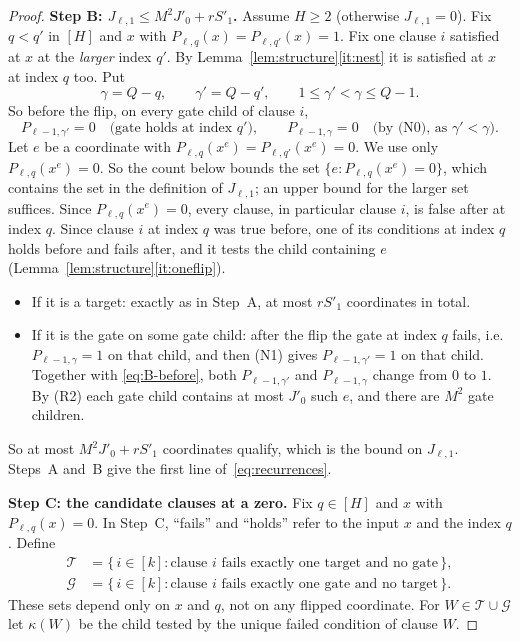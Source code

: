 \documentclass[11pt]{article}
\theoremstyle{definition}
\theoremstyle{remark}
\begin{document}
\begin{proof}
\medskip\noindent\textbf{Step B: \(J_{\ell,1}\le M^2J'_0+rS'_1\).}
Assume \(H\ge2\) (otherwise \(J_{\ell,1}=0\)). Fix \(q<q'\) in \([H]\) and
\(x\) with \(P_{\ell,q}(x)=P_{\ell,q'}(x)=1\). Fix one clause \(i\) satisfied
at \(x\) at the \emph{larger} index \(q'\). By
Lemma~\ref{lem:structure}\ref{it:nest} it is satisfied at \(x\) at index
\(q\) too. Put
\[
 \gamma=Q-q,\qquad \gamma'=Q-q',\qquad 1\leq \gamma'<\gamma\le Q-1 .
\]
So before the flip, on every gate child of clause \(i\),
\begin{equation}\label{eq:B-before}
 P_{\ell-1,\gamma'}=0\quad\text{(gate holds at index \(q'\))},\qquad
 P_{\ell-1,\gamma}=0\quad\text{(by (N0), as \(\gamma'<\gamma\))}.
\end{equation}
Let \(e\) be a coordinate with \(P_{\ell,q}(x^e)=P_{\ell,q'}(x^e)=0\). We use
only \(P_{\ell,q}(x^e)=0\). So the count below bounds the set
\(\{e:P_{\ell,q}(x^e)=0\}\), which contains the set in the definition of
\(J_{\ell,1}\); an upper bound for the larger set suffices. Since
\(P_{\ell,q}(x^e)=0\), every clause, in particular clause \(i\), is
false after at index \(q\). Since clause \(i\) at index \(q\) was true
before, one of its conditions at index \(q\) holds before and fails after,
and it tests the child containing \(e\)
(Lemma~\ref{lem:structure}\ref{it:oneflip}).
\begin{itemize}[nosep]
\item If it is a target: exactly as in Step~A, at most \(rS'_1\) coordinates
 in total.
\item If it is the gate on some gate child: after the flip the gate at
 index \(q\) fails, i.e.\ \(P_{\ell-1,\gamma}=1\) on that child, and then
 (N1) gives \(P_{\ell-1,\gamma'}=1\) on that child. Together with
 \eqref{eq:B-before}, both \(P_{\ell-1,\gamma'}\) and \(P_{\ell-1,\gamma}\)
 change from \(0\) to \(1\). By (R2) each gate child contains at most
 \(J'_0\) such \(e\), and there are \(M^2\) gate children.
\end{itemize}
So at most \(M^2J'_0+rS'_1\) coordinates qualify, which is the bound on
\(J_{\ell,1}\). Steps~A and~B give the first line of~\eqref{eq:recurrences}.

\medskip\noindent\textbf{Step C: the candidate clauses at a zero.}
Fix \(q\in[H]\) and \(x\) with \(P_{\ell,q}(x)=0\). In Step~C, ``fails'' and
``holds'' refer to the input \(x\) and the index \(q\). Define
\begin{align*}
 \mathcal T&=\{\,i\in[k]:\text{clause \(i\) fails exactly one target and no gate}\,\},\\
 \mathcal G&=\{\,i\in[k]:\text{clause \(i\) fails exactly one gate and no target}\,\}.
\end{align*}
These sets depend only on \(x\) and \(q\), not on any flipped coordinate.
For \(W\in\mathcal T\cup\mathcal G\) let \(\kappa(W)\) be the child tested
by the unique failed condition of clause \(W\).


\end{proof}
\end{document}
